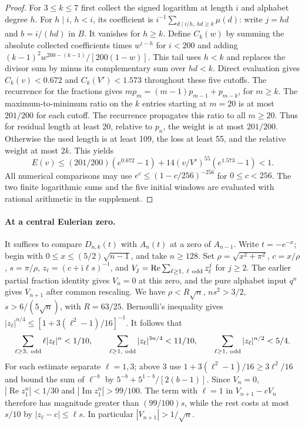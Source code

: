 \begin{proof}
For $3\le k\le7$ first collect the signed logarithm at length $i$ and alphabet degree $h$. For $h\mid i$, $h<i$, its coefficient is
$i^{-1}\sum_{d\mid i/h,\ hd\ge k}\mu(d)$: write $j=hd$ and $b=i/(hd)$ in $B$. It vanishes for $h\ge k$. Define $C_k(w)$ by summing the absolute collected coefficients times $w^{i-h}$ for $i<200$ and adding
$(k-1)^2w^{200-(k-1)}/[200(1-w)]$. This tail uses $h<k$ and replaces the divisor sum by minus its complementary sum over $hd<k$. Direct evaluation gives $C_k(v)<0.672$ and $C_k(V')<1.573$ throughout these five cutoffs. The recurrence for the fractions gives $m p_m=(m-1)p_{m-1}+p_{m-k}$, for $m\ge k$. The maximum-to-minimum ratio on the $k$ entries starting at $m=20$ is at most $201/200$ for each cutoff. The recurrence propagates this ratio to all $m\ge20$. Thus for residual length at least 20, relative to $p_n$, the weight is at most $201/200$. Otherwise the used length is at least 109, the loss at least 55, and the relative weight at most $2k$. This yields
\[
 E(v)\le(201/200)(e^{0.672}-1)+14(v/V')^{55}(e^{1.573}-1)<1.
\]
All numerical comparisons may use $e^c\le(1-c/256)^{-256}$ for $0\le c<256$. The two finite logarithmic sums and the five initial windows are evaluated with rational arithmetic in the supplement.
\end{proof}

\paragraph{At a central Eulerian zero.}
It suffices to compare $D_{n,k}(t)$ with $A_n(t)$ at a zero of $A_{n-1}$.
Write $t=-e^{-x}$; begin with $0\le x\le(5/2)\sqrt{n-1}$, and take $n\ge128$.
Set $\rho=\sqrt{x^2+\pi^2}$, $c=x/\rho$, $s=\pi/\rho$, $z_\ell=(c+\mathrm i\ell s)^{-1}$, and $V_j=\operatorname{Re}\sum_{\ell\ge1,\ \ell\ {\rm odd}} z_\ell^j$ for $j\ge2$.
The earlier partial fraction identity gives $V_n=0$ at this zero, and the pure alphabet input $q^n$ gives $V_{n+1}$ after common rescaling.
We have $\rho<R\sqrt n$, $ns^2>3/2$, $s>6/(5\sqrt n)$, with $R=63/25$.
Bernoulli's inequality gives $|z_\ell|^{n/4}\le[1+3(\ell^2-1)/16]^{-1}$.
It follows that
\[
 \sum_{\ell\ge3,\ {\rm odd}}\ell|z_\ell|^n<1/10,\qquad
 \sum_{\ell\ge1,\ {\rm odd}}|z_\ell|^{3n/4}<11/10,\qquad
 \sum_{\ell\ge1,\ {\rm odd}}|z_\ell|^{n/2}<5/4.
\]
For each estimate separate $\ell=1,3$; above 3 use $1+3(\ell^2-1)/16\ge3\ell^2/16$ and bound the sum of $\ell^{-b}$ by $5^{-b}+5^{1-b}/[2(b-1)]$.
Since $V_n=0$, $|\operatorname{Re}z_1^n|<1/30$ and $|\operatorname{Im}z_1^n|>99/100$.
The term with $\ell=1$ in $V_{n+1}-cV_n$ therefore has magnitude greater than $(99/100)s$, while the rest costs at most $s/10$ by $|z_\ell-c|\le\ell s$. In particular $|V_{n+1}|>1/\sqrt n$.

